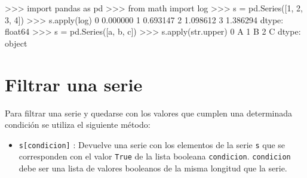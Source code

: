 \documentclass[
  spanish,
  a4paper,
]{scrreport}
\newenvironment{Shaded}{\begin{snugshade}}{\end{snugshade}}
\newcommand{\BuiltInTok}[1]{\textcolor[rgb]{0.00,0.23,0.31}{#1}}
\newcommand{\DecValTok}[1]{\textcolor[rgb]{0.68,0.00,0.00}{#1}}
\newcommand{\FloatTok}[1]{\textcolor[rgb]{0.68,0.00,0.00}{#1}}
\newcommand{\ImportTok}[1]{\textcolor[rgb]{0.00,0.46,0.62}{#1}}
\newcommand{\NormalTok}[1]{\textcolor[rgb]{0.00,0.23,0.31}{#1}}
\newcommand{\OperatorTok}[1]{\textcolor[rgb]{0.37,0.37,0.37}{#1}}
\newcommand{\StringTok}[1]{\textcolor[rgb]{0.13,0.47,0.30}{#1}}
\providecommand{\tightlist}{%
  \setlength{\itemsep}{0pt}\setlength{\parskip}{0pt}}
\begin{document}
\begin{Shaded}
\begin{Highlighting}[]
\OperatorTok{\textgreater{}\textgreater{}\textgreater{}} \ImportTok{import}\NormalTok{ pandas }\ImportTok{as}\NormalTok{ pd}
\OperatorTok{\textgreater{}\textgreater{}\textgreater{}} \ImportTok{from}\NormalTok{ math }\ImportTok{import}\NormalTok{ log}
\OperatorTok{\textgreater{}\textgreater{}\textgreater{}}\NormalTok{ s }\OperatorTok{=}\NormalTok{ pd.Series([}\DecValTok{1}\NormalTok{, }\DecValTok{2}\NormalTok{, }\DecValTok{3}\NormalTok{, }\DecValTok{4}\NormalTok{])}
\OperatorTok{\textgreater{}\textgreater{}\textgreater{}}\NormalTok{ s.}\BuiltInTok{apply}\NormalTok{(log)}
\DecValTok{0}    \FloatTok{0.000000}
\DecValTok{1}    \FloatTok{0.693147}
\DecValTok{2}    \FloatTok{1.098612}
\DecValTok{3}    \FloatTok{1.386294}
\NormalTok{dtype: float64}
\OperatorTok{\textgreater{}\textgreater{}\textgreater{}}\NormalTok{ s }\OperatorTok{=}\NormalTok{ pd.Series([}\StringTok{\textquotesingle{}a\textquotesingle{}}\NormalTok{, }\StringTok{\textquotesingle{}b\textquotesingle{}}\NormalTok{, }\StringTok{\textquotesingle{}c\textquotesingle{}}\NormalTok{])}
\OperatorTok{\textgreater{}\textgreater{}\textgreater{}}\NormalTok{ s.}\BuiltInTok{apply}\NormalTok{(}\BuiltInTok{str}\NormalTok{.upper)}
\DecValTok{0}\NormalTok{    A}
\DecValTok{1}\NormalTok{    B}
\DecValTok{2}\NormalTok{    C}
\NormalTok{dtype: }\BuiltInTok{object}
\end{Highlighting}
\end{Shaded}

\section{Filtrar una serie}\label{filtrar-una-serie}

Para filtrar una serie y quedarse con los valores que cumplen una
determinada condición se utiliza el siguiente método:

\begin{itemize}
\tightlist
\item
  \texttt{s{[}condicion{]}} : Devuelve una serie con los elementos de la
  serie \texttt{s} que se corresponden con el valor \texttt{True} de la
  lista booleana \texttt{condicion}. \texttt{condicion} debe ser una
  lista de valores booleanos de la misma longitud que la serie.
\end{itemize}
\end{document}
